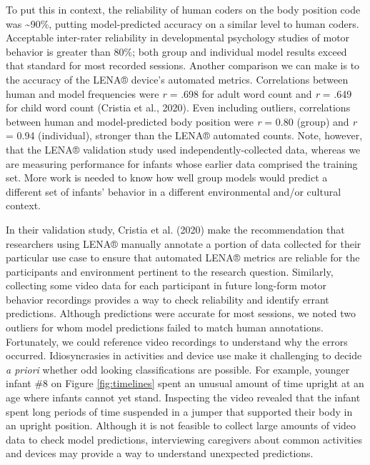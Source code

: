 \documentclass[
  man]{apa6}
\begin{document}
To put this in context, the reliability of human coders on the body position code was \textasciitilde90\%, putting model-predicted accuracy on a similar level to human coders. Acceptable inter-rater reliability in developmental psychology studies of motor behavior is greater than 80\%; both group and individual model results exceed that standard for most recorded sessions. Another comparison we can make is to the accuracy of the LENA® device's automated metrics. Correlations between human and model frequencies were \emph{r} = .698 for adult word count and \emph{r} = .649 for child word count (Cristia et al., 2020). Even including outliers, correlations between human and model-predicted body position were \emph{r} = 0.80 (group) and \emph{r} = 0.94 (individual), stronger than the LENA® automated counts. Note, however, that the LENA® validation study used independently-collected data, whereas we are measuring performance for infants whose earlier data comprised the training set. More work is needed to know how well group models would predict a different set of infants' behavior in a different environmental and/or cultural context.

In their validation study, Cristia et al. (2020) make the recommendation that researchers using LENA® manually annotate a portion of data collected for their particular use case to ensure that automated LENA® metrics are reliable for the participants and environment pertinent to the research question. Similarly, collecting some video data for each participant in future long-form motor behavior recordings provides a way to check reliability and identify errant predictions. Although predictions were accurate for most sessions, we noted two outliers for whom model predictions failed to match human annotations. Fortunately, we could reference video recordings to understand why the errors occurred. Idiosyncrasies in activities and device use make it challenging to decide \emph{a priori} whether odd looking classifications are possible. For example, younger infant \#8 on Figure \ref{fig:timelines} spent an unusual amount of time upright at an age where infants cannot yet stand. Inspecting the video revealed that the infant spent long periods of time suspended in a jumper that supported their body in an upright position. Although it is not feasible to collect large amounts of video data to check model predictions, interviewing caregivers about common activities and devices may provide a way to understand unexpected predictions.
\end{document}
